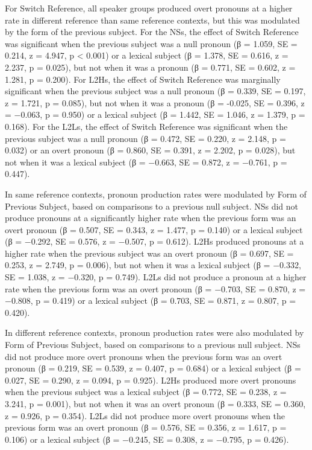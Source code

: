 \documentclass[output=paper,colorlinks,citecolor=brown,draftmode]{langscibook}
\begin{document}
For Switch Reference, all speaker groups produced overt pronouns at a higher rate in different reference than same reference contexts, but this was modulated by the form of the previous subject. For the NSs, the effect of Switch Reference was significant when the previous subject was a null pronoun (β = 1.059, SE = 0.214, z = 4.947, p < 0.001) or a lexical subject (β = 1.378, SE = 0.616, z = 2.237, p = 0.025), but not when it was a pronoun (β = 0.771, SE = 0.602, z = 1.281, p = 0.200). For L2Hs, the effect of Switch Reference was marginally significant when the previous subject was a null pronoun (β = 0.339, SE = 0.197, z = 1.721, p = 0.085), but not when it was a pronoun (β = -0.025, SE = 0.396, z = $-$0.063, p = 0.950) or a lexical subject (β = 1.442, SE = 1.046, z = 1.379, p = 0.168). For the L2Ls, the effect of Switch Reference was significant when the previous subject was a null pronoun (β = 0.472, SE = 0.220, z = 2.148, p = 0.032) or an overt pronoun (β = 0.860, SE = 0.391, z = 2.202, p = 0.028), but not when it was a lexical subject (β = $-$0.663, SE = 0.872, z = $-$0.761, p = 0.447).

\hspace*{-2.4pt}In same reference contexts, pronoun production rates were modulated by Form of Previous Subject, based on comparisons to a previous null subject. NSs did not produce pronouns at a significantly higher rate when the previous form was an overt pronoun (β = 0.507, SE = 0.343, z = 1.477, p = 0.140) or a lexical subject (β = $-$0.292, SE = 0.576, z = $-$0.507, p = 0.612). L2Hs produced pronouns at a higher rate when the previous subject was an overt pronoun (β = 0.697, SE = 0.253, z = 2.749, p = 0.006), but not when it was a lexical subject (β = $-$0.332, SE = 1.038, z = $-$0.320, p = 0.749). L2Ls did not produce a pronoun at a higher rate when the previous form was an overt pronoun (β = $-$0.703, SE = 0.870, z = $-$0.808, p = 0.419) or a lexical subject (β = 0.703, SE = 0.871, z = 0.807, p = 0.420).

In different reference contexts, pronoun production rates were also modulated by Form of Previous Subject, based on comparisons to a previous null subject. NSs did not produce more overt pronouns when the previous form was an overt pronoun (β = 0.219, SE = 0.539, z = 0.407, p = 0.684) or a lexical subject (β = 0.027, SE = 0.290, z = 0.094, p = 0.925). L2Hs produced more overt pronouns when the previous subject was a lexical subject (β = 0.772, SE = 0.238, z = 3.241, p = 0.001), but not when it was an overt pronoun (β = 0.333, SE = 0.360, z = 0.926, p = 0.354). L2Ls did not produce more overt pronouns when the previous form was an overt pronoun (β = 0.576, SE = 0.356, z = 1.617, p = 0.106) or a lexical subject (β = $-$0.245, SE = 0.308, z = $-$0.795, p = 0.426).
\end{document}
